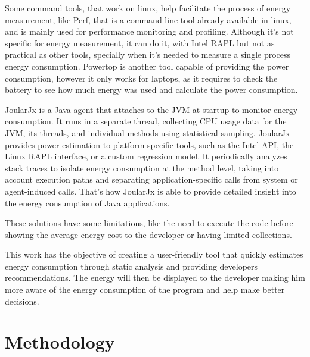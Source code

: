 \documentclass[sigplan]{acmart}
\begin{document}
Some command tools, that work on linux, help facilitate the process of energy measurement, like Perf\cite{perfwiki_main}, that is a command line tool already available in linux, and is mainly used for performance monitoring and profiling. Although it's not specific for energy measurement, it can do it, with Intel RAPL but not as practical as other tools, specially when it's needed to measure a single process energy consumption. Powertop\cite{archlinux_Powertop} is another tool capable of providing the power consumption, however it only works for laptops, as it requires to check the battery to see how much energy was used and calculate the power consumption.

JoularJx\cite{noureddine-ie-2022} is a Java agent that attaches to the JVM at startup to monitor energy consumption. It runs in a separate thread, collecting CPU usage data for the JVM, its threads, and individual methods using statistical sampling. JoularJx provides power estimation to platform-specific tools, such as the Intel API, the Linux RAPL interface, or a custom regression model. It periodically analyzes stack traces to isolate energy consumption at the method level, taking into account execution paths and separating application-specific calls from system or agent-induced calls. That's how JoularJx is able to provide detailed insight into the energy consumption of Java applications.

These solutions have some limitations, like the need to execute the code before showing the average energy cost to the developer or having limited collections.

This work has the objective of creating a user-friendly tool that quickly estimates energy consumption through static analysis and providing developers recommendations. The energy will then be displayed to the developer making him more aware of the energy consumption of the program and help make better decisions.


% 


\section{Methodology} \label{sec:work}
\end{document}
